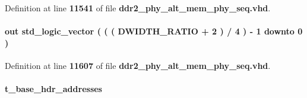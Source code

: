Definition at line {\bf 11541} of file {\bf ddr2\+\_\+phy\+\_\+alt\+\_\+mem\+\_\+phy\+\_\+seq.\+vhd}.

\paragraph[{int\+\_\+ac\+\_\+nt}]{ {\bfseries \textcolor{keywordflow}{out}\textcolor{vhdlchar}{ }} {\bfseries \textcolor{comment}{std\+\_\+logic\+\_\+vector}\textcolor{vhdlchar}{ }\textcolor{vhdlchar}{(}\textcolor{vhdlchar}{ }\textcolor{vhdlchar}{(}\textcolor{vhdlchar}{ }\textcolor{vhdlchar}{(}\textcolor{vhdlchar}{ }\textcolor{vhdlchar}{ }\textcolor{vhdlchar}{ }\textcolor{vhdlchar}{ }{\bfseries {\bf D\+W\+I\+D\+T\+H\+\_\+\+R\+A\+T\+IO}} \textcolor{vhdlchar}{+}\textcolor{vhdlchar}{ } \textcolor{vhdldigit}{2} \textcolor{vhdlchar}{ }\textcolor{vhdlchar}{)}\textcolor{vhdlchar}{ }\textcolor{vhdlchar}{/}\textcolor{vhdlchar}{ } \textcolor{vhdldigit}{4} \textcolor{vhdlchar}{ }\textcolor{vhdlchar}{)}\textcolor{vhdlchar}{ }\textcolor{vhdlchar}{-\/}\textcolor{vhdlchar}{ } \textcolor{vhdldigit}{1} \textcolor{vhdlchar}{ }\textcolor{keywordflow}{downto}\textcolor{vhdlchar}{ }\textcolor{vhdlchar}{ } \textcolor{vhdldigit}{0} \textcolor{vhdlchar}{ }\textcolor{vhdlchar}{)}\textcolor{vhdlchar}{ }} \hspace{0.3cm}{\ttfamily [Port]}}\label{classddr2__phy__alt__mem__phy__ctrl_abe1f287f059bbf2cadf144b325df3250}


Definition at line {\bf 11607} of file {\bf ddr2\+\_\+phy\+\_\+alt\+\_\+mem\+\_\+phy\+\_\+seq.\+vhd}.

\paragraph[{I\+R\+A\+M\+\_\+\+A\+D\+D\+R\+E\+S\+S\+I\+NG}]{ {\bfseries \textcolor{vhdlchar}{ }} {\bfseries {\bfseries {\bf t\+\_\+base\+\_\+hdr\+\_\+addresses}} \textcolor{vhdlchar}{ }} \hspace{0.3cm}{\ttfamily [Generic]}}\label{classddr2__phy__alt__mem__phy__ctrl_a91ba2d8f553ba122eba63b0b5759913a}


